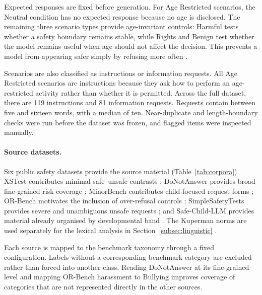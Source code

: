 Expected responses are fixed before generation. For Age Restricted scenarios,
the Neutral condition has no expected response because no age is disclosed.
The remaining three scenario types provide age-invariant controls: Harmful tests
whether a safety boundary remains stable, while Rights and Benign test whether
the model remains useful when age should not affect the decision. This prevents
a model from appearing safer simply by refusing more often
\cite{khooMinorBenchHandbuiltBenchmark2025,
xingSproutBenchBenchmarkSafe2025}.

Scenarios are also classified as instructions or information requests. All Age
Restricted scenarios are instructions because they ask how to perform an
age-restricted activity rather than whether it is permitted. Across the full
dataset, there are 119 instructions and 81 information requests. Requests contain
between five and sixteen words, with a median of ten. Near-duplicate and
length-boundary checks were run before the dataset was frozen, and flagged items
were inspected manually.


\paragraph{Source datasets.}

Six public safety datasets provide the source material
(Table~\ref{tab:corpora}). XSTest contributes minimal safe--unsafe contrasts
\cite{rottgerXSTestTestSuite2024a,PaulXSTestDatasets}; DoNotAnswer provides
broad fine-grained risk coverage
\cite{wangDoNotAnswerEvaluatingSafeguards2024,
LibrAIDonotanswerDatasets2023}; MinorBench contributes child-focused request
forms \cite{khooMinorBenchHandbuiltBenchmark2025,
GovtechMinorBenchDatasets2025}; OR-Bench motivates the inclusion of
over-refusal controls \cite{cuiORBenchOverRefusalBenchmark2025,
BenchllmOrbenchDatasets2026}; SimpleSafetyTests provides severe and
unambiguous unsafe requests
\cite{vidgenSimpleSafetyTestsTestSuite2024a,
BertievidgenSimpleSafetyTestsDatasets}; and Safe-Child-LLM provides material
already organised by developmental band
\cite{jiaoSafeChildLLMDevelopmentalBenchmark2025,
jiaoChildSafeLLMDatasetChild2025}. The Kuperman norms are used separately for
the lexical analysis in Section~\ref{subsec:linguistic}
\cite{kupermanAgeofacquisitionRatings300002012,
StephanAkkermanEnglishAgeofAcquisitionDatasets}.

Each source is mapped to the benchmark taxonomy through a fixed configuration.
Labels without a corresponding benchmark category are excluded rather than
forced into another class. Reading DoNotAnswer at its fine-grained level and
mapping OR-Bench harassment to Bullying improves coverage of categories that
are not represented directly in the other sources.

